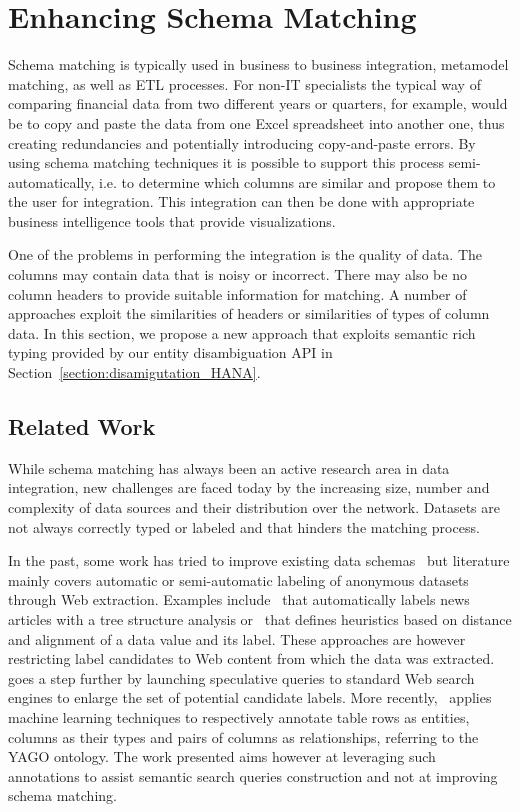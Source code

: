 \section{Enhancing Schema Matching}

Schema matching is typically used in business to business integration, metamodel matching, as well as ETL processes. For non-IT specialists the typical way of comparing financial data from two different years or quarters, for example, would be to copy and paste the data from one Excel spreadsheet into another one, thus creating redundancies and potentially introducing copy-and-paste errors. By using schema matching techniques it is possible to support this process semi-automatically, i.e. to determine which columns are similar and propose them to the user for integration. This integration can then be done with appropriate business intelligence tools that provide visualizations.

One of the problems in performing the integration is the quality of data. The columns may contain data that is noisy or incorrect. There may also be no column headers to provide suitable information for matching. A number of approaches exploit the similarities of headers or similarities of types of column data. In this section, we propose a new approach that exploits semantic rich typing provided by our entity disambiguation API in Section~\ref{section:disamigutation_HANA}.

\subsection{Related Work}

While schema matching has always been an active research area in data integration, new challenges are faced today by the increasing size, number and complexity of data sources and their distribution over the network. Datasets are not always correctly typed or labeled and that hinders the matching process.

In the past, some work has tried to improve existing data schemas~\cite{ Miller:IEEE:03} but literature mainly covers automatic or semi-automatic labeling of anonymous datasets through Web extraction. Examples include~\cite{Reis:WWW:04} that automatically labels news articles with a tree structure analysis or~\cite{Wang:WWW:03} that defines heuristics based on distance and alignment of a data value and its label. These approaches are however restricting label candidates to Web content from which the data was extracted.~\cite{DaSilva:OTM:07} goes a step further by launching speculative queries to standard Web search engines to enlarge the set of potential candidate labels. More recently,~\cite{Limaye:VLDB:10} applies machine learning techniques to respectively annotate table rows as entities, columns as their types and pairs of columns as relationships, referring to the YAGO ontology. The work presented aims however at leveraging such annotations to assist semantic search queries construction and not at improving schema matching.

